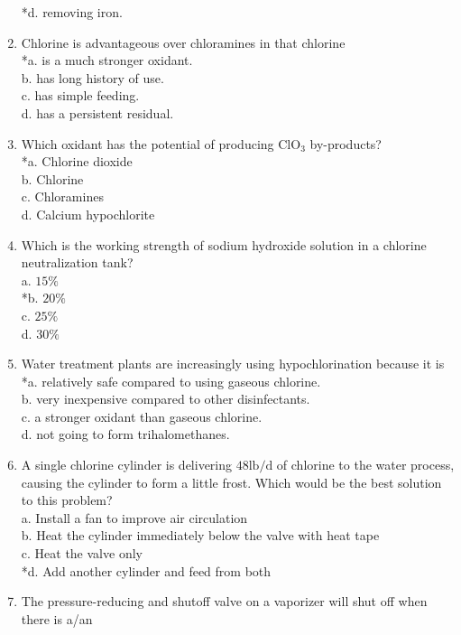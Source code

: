 \begin{enumerate}[1.]
*d. removing iron.\\
\item Chlorine is advantageous over chloramines in that chlorine\\
*a. is a much stronger oxidant.\\
b. has long history of use.\\
c. has simple feeding.\\
d. has a persistent residual.\\
\item Which oxidant has the potential of producing $\mathrm{ClO}_{3}$ by-products?\\
*a. Chlorine dioxide\\
b. Chlorine\\
c. Chloramines\\
d. Calcium hypochlorite\\
\item Which is the working strength of sodium hydroxide solution in a chlorine neutralization tank?\\
a. $15 \%$\\
*b. $20 \%$\\
c. $25 \%$\\
d. $30 \%$\\
\item Water treatment plants are increasingly using hypochlorination because it is\\
*a. relatively safe compared to using gaseous chlorine.\\
b. very inexpensive compared to other disinfectants.\\
c. a stronger oxidant than gaseous chlorine.\\
d. not going to form trihalomethanes.\\
\item A single chlorine cylinder is delivering $48 \mathrm{lb} / \mathrm{d}$ of chlorine to the water process, causing the cylinder to form a little frost. Which would be the best solution to this problem?\\
a. Install a fan to improve air circulation\\
b. Heat the cylinder immediately below the valve with heat tape\\
c. Heat the valve only\\
*d. Add another cylinder and feed from both\\
\item The pressure-reducing and shutoff valve on a vaporizer will shut off when there is a/an\\

\end{enumerate}
